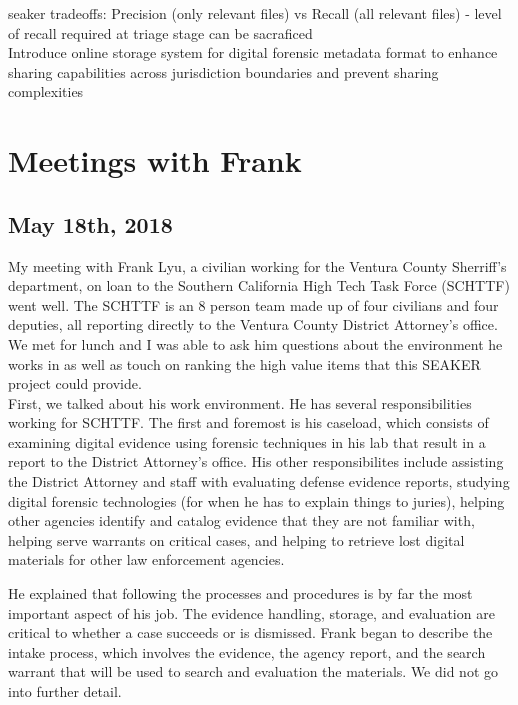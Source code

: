 \documentclass[12pt]{article}
\begin{document}
\gls{seaker} tradeoffs: Precision (only relevant files) vs Recall (all relevant files)
- level of recall required at triage stage can be sacraficed\\

Introduce online storage system for digital forensic metadata format to enhance sharing capabilities across
jurisdiction boundaries and prevent sharing complexities

\section{Meetings with Frank}
\label{sect-frank}
\vspace{0.5 cm}
\subsection{May 18th, 2018}

My meeting with Frank Lyu, a civilian working for the Ventura County Sherriff's department, on loan to
the Southern California High Tech Task Force (SCHTTF) went well.  The SCHTTF is an 8 person team made up of
four civilians and four deputies, all reporting directly to the Ventura County District Attorney's office.
We met for lunch and I was able to ask him questions about the environment he works in as well as touch on
ranking the high value items that this SEAKER project could provide.\\

First, we talked about his work environment.  He has several responsibilities working for SCHTTF.  The first
and foremost is his caseload, which consists of examining digital evidence using forensic techniques in his
lab that result in a report to the District Attorney's office.  His other responsibilites include assisting
the District Attorney and staff with evaluating defense evidence reports, studying digital forensic 
technologies (for when he has to explain things to juries), helping other agencies identify and catalog
evidence that they are not familiar with, helping serve warrants on critical cases, and helping to retrieve
lost digital materials for other law enforcement agencies.

He explained that following the processes and procedures is by far the most important aspect of his job.  The
evidence handling, storage, and evaluation are critical to whether a case succeeds or is dismissed. Frank
began to describe the intake process, which involves the evidence, the agency report, and the search warrant
that will be used to search and evaluation the materials.  We did not go into further detail.
\end{document}
